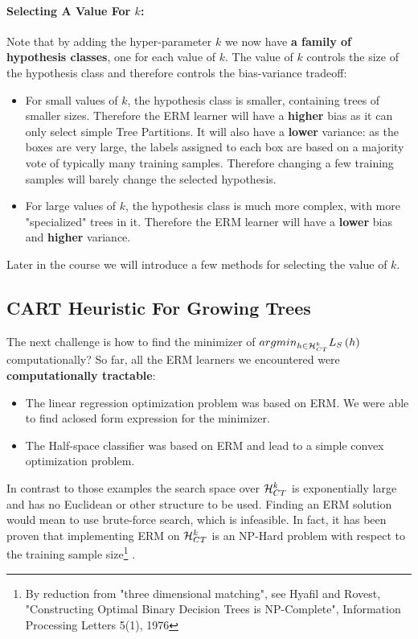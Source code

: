 \paragraph{Selecting A Value For $k$:} Note that by adding the hyper-parameter $k$ we now have \textbf{a family of hypothesis classes}, one for each value of $k$. The value of $k$ controls the size of the hypothesis class and therefore controls the bias-variance tradeoff:
\begin{itemize}
	\item For small values of $k$, the hypothesis class is smaller, containing trees of smaller sizes. Therefore the ERM learner will have a \textbf{higher} bias as it can only select simple Tree Partitions. It will also have a \textbf{lower} variance: as the boxes are very large, the labels assigned to each box are based on a majority vote of typically many training samples. Therefore changing a few training samples will barely change the selected hypothesis.
	\item For large values of $k$, the hypothesis class is much more complex, with more "specialized" trees in it. Therefore the ERM learner will have a \textbf{lower} bias and \textbf{higher} variance.
\end{itemize}
Later in the course we will introduce a few methods for selecting the value of $k$.

\subsection{CART Heuristic For Growing Trees}
The next challenge is how to find the minimizer of $argmin_{h\in\mathcal{H}_{CT}^k} L_S\left(h\right)$ computationally? So far, all the ERM learners we encountered were \textbf{computationally tractable}: 
\begin{itemize}
	\item The linear regression optimization problem was based on ERM. We were able to find aclosed form expression for the minimizer.
	\item The Half-space classifier was based on ERM and lead to a simple convex optimization problem.
\end{itemize}

In contrast to those examples the search space over $\mathcal{H}_{CT}^k$ is exponentially large and has no Euclidean or other structure to be used. Finding an ERM solution would mean to use brute-force search, which is infeasible. In fact, it has been proven that implementing ERM on $\mathcal{H}_{CT}^k$ is an NP-Hard problem with respect to the training sample size\footnote{By reduction from "three dimensional matching", see Hyafil and Rovest, "Constructing Optimal Binary Decision Trees is NP-Complete", Information Processing Letters 5(1), 1976} .

